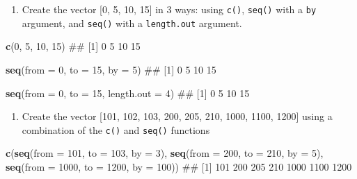 \documentclass[]{book}
\newenvironment{Shaded}{\begin{snugshade}}{\end{snugshade}}
\newcommand{\KeywordTok}[1]{\textcolor[rgb]{0.13,0.29,0.53}{\textbf{{#1}}}}
\newcommand{\DataTypeTok}[1]{\textcolor[rgb]{0.13,0.29,0.53}{{#1}}}
\newcommand{\DecValTok}[1]{\textcolor[rgb]{0.00,0.00,0.81}{{#1}}}
\newcommand{\NormalTok}[1]{{#1}}
\providecommand{\tightlist}{%
  \setlength{\itemsep}{0pt}\setlength{\parskip}{0pt}}
\theoremstyle{definition}
\theoremstyle{definition}
\theoremstyle{remark}
\begin{document}
\begin{enumerate}
\def\labelenumi{\arabic{enumi}.}
\setcounter{enumi}{2}
\tightlist
\item
  Create the vector {[}0, 5, 10, 15{]} in 3 ways: using \texttt{c()},
  \texttt{seq()} with a \texttt{by} argument, and \texttt{seq()} with a
  \texttt{length.out} argument.
\end{enumerate}

\begin{Shaded}
\begin{Highlighting}[]
\KeywordTok{c}\NormalTok{(}\DecValTok{0}\NormalTok{, }\DecValTok{5}\NormalTok{, }\DecValTok{10}\NormalTok{, }\DecValTok{15}\NormalTok{)}
\NormalTok{## [1]  0  5 10 15}

\KeywordTok{seq}\NormalTok{(}\DataTypeTok{from =} \DecValTok{0}\NormalTok{, }\DataTypeTok{to =} \DecValTok{15}\NormalTok{, }\DataTypeTok{by =} \DecValTok{5}\NormalTok{)}
\NormalTok{## [1]  0  5 10 15}

\KeywordTok{seq}\NormalTok{(}\DataTypeTok{from =} \DecValTok{0}\NormalTok{, }\DataTypeTok{to =} \DecValTok{15}\NormalTok{, }\DataTypeTok{length.out =} \DecValTok{4}\NormalTok{)}
\NormalTok{## [1]  0  5 10 15}
\end{Highlighting}
\end{Shaded}

\begin{enumerate}
\def\labelenumi{\arabic{enumi}.}
\setcounter{enumi}{3}
\tightlist
\item
  Create the vector {[}101, 102, 103, 200, 205, 210, 1000, 1100, 1200{]}
  using a combination of the \texttt{c()} and \texttt{seq()} functions
\end{enumerate}

\begin{Shaded}
\begin{Highlighting}[]
\KeywordTok{c}\NormalTok{(}\KeywordTok{seq}\NormalTok{(}\DataTypeTok{from =} \DecValTok{101}\NormalTok{, }\DataTypeTok{to =} \DecValTok{103}\NormalTok{, }\DataTypeTok{by =} \DecValTok{3}\NormalTok{), }
  \KeywordTok{seq}\NormalTok{(}\DataTypeTok{from =} \DecValTok{200}\NormalTok{, }\DataTypeTok{to =} \DecValTok{210}\NormalTok{, }\DataTypeTok{by =} \DecValTok{5}\NormalTok{), }
  \KeywordTok{seq}\NormalTok{(}\DataTypeTok{from =} \DecValTok{1000}\NormalTok{, }\DataTypeTok{to =} \DecValTok{1200}\NormalTok{, }\DataTypeTok{by =} \DecValTok{100}\NormalTok{))}
\NormalTok{## [1]  101  200  205  210 1000 1100 1200}
\end{Highlighting}
\end{Shaded}
\end{document}
